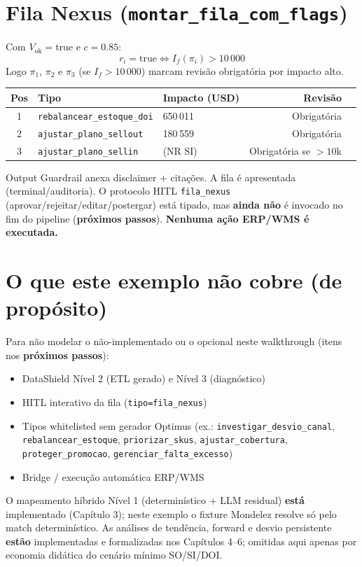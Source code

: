 \documentclass[a4paper, 12pt]{report}
\theoremstyle{definition}
\theoremstyle{remark}
\begin{document}
\section{Fila Nexus (\texttt{montar\_fila\_com\_flags})}

Com $V_{\text{ok}}=\text{true}$ e $c=0.85$:
\[
  r_i = \text{true} \iff I_f(\pi_i) > 10\,000
\]
Logo $\pi_1$, $\pi_2$ e $\pi_3$ (se $I_f > 10\,000$) marcam
revis\~ao obrigat\'oria por impacto alto.

\begin{center}
\begin{tabular}{cllrl}
  \toprule
  \textbf{Pos} & \textbf{Tipo} & \textbf{Impacto (USD)} & \textbf{Revis\~ao} \\
  \midrule
  1 & \texttt{rebalancear\_estoque\_doi} & 650\,011 & Obrigat\'oria \\
  2 & \texttt{ajustar\_plano\_sellout} & 180\,559 & Obrigat\'oria \\
  3 & \texttt{ajustar\_plano\_sellin} & (NR SI) & Obrigat\'oria se $>10$k \\
  \bottomrule
\end{tabular}
\end{center}

Output Guardrail anexa disclaimer + cita\c{c}\~oes. A fila \'e
apresentada (terminal/auditoria). O protocolo HITL
\texttt{fila\_nexus} (aprovar/rejeitar/editar/postergar) est\'a
tipado, mas \textbf{ainda n\~ao} \'e invocado no fim do pipeline
(\textbf{pr\'oximos passos}). \textbf{Nenhuma a\c{c}\~ao ERP/WMS
\'e executada.}


\section{O que este exemplo n\~ao cobre (de prop\'osito)}

Para n\~ao modelar o n\~ao-implementado ou o opcional neste walkthrough
(itens nos \textbf{pr\'oximos passos}):
\begin{itemize}
  \item DataShield N\'ivel 2 (ETL gerado) e N\'ivel 3 (diagn\'ostico)
  \item HITL interativo da fila (\texttt{tipo=fila\_nexus})
  \item Tipos whitelisted sem gerador Optimus
    (ex.: \texttt{investigar\_desvio\_canal}, \texttt{rebalancear\_estoque},
    \texttt{priorizar\_skus}, \texttt{ajustar\_cobertura},
    \texttt{proteger\_promocao}, \texttt{gerenciar\_falta\_excesso})
  \item Bridge / execu\c{c}\~ao autom\'atica ERP/WMS
\end{itemize}
O mapeamento h\'ibrido N\'ivel 1 (determin\'istico + LLM residual)
\textbf{est\'a} implementado (Cap\'itulo 3); neste exemplo o fixture
Mondelez resolve s\'o pelo match determin\'istico.
As an\'alises de tend\^encia, forward e desvio persistente \textbf{est\~ao}
implementadas e formalizadas nos Cap\'itulos 4--6; omitidas aqui apenas
por economia did\'atica do cen\'ario m\'inimo SO/SI/DOI.
\end{document}
